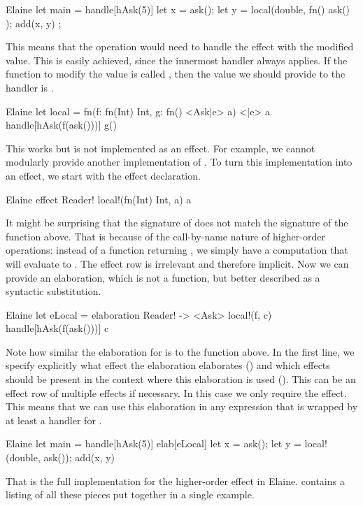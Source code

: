 \begin{lst}{Elaine}
let main = handle[hAsk(5)] {
    let x = ask();
    let y = local(double, fn() { ask() });
    add(x, y)
};
\end{lst}
%
This means that the  operation would need to handle the  effect with the modified value. This is easily achieved, since the innermost handler always applies. If the function to modify the value is called , then the value we should provide to the handler is .

\begin{lst}{Elaine}
let local = fn(f: fn(Int) Int, g: fn() <Ask|e> a) <|e> a {
    handle[hAsk(f(ask()))] { g() }
}
\end{lst}
%
This works but is not implemented as an effect. For example, we cannot modularly provide another implementation of . To turn this implementation into an effect, we start with the effect declaration.

\begin{lst}{Elaine}
effect Reader! {
    local!(fn(Int) Int, a) a
}
\end{lst}
%
It might be surprising that the signature of  does not match the signature of the function above. That is because of the call-by-name nature of higher-order operations: instead of a function returning , we simply have a computation that will evaluate to . The effect row is irrelevant and therefore implicit. Now we can provide an elaboration, which is not a function, but better described as a syntactic substitution.

\begin{lst}{Elaine}
let eLocal = elaboration Reader! -> <Ask> {
    local!(f, c) {
        handle[hAsk(f(ask()))] c
    }
}
\end{lst}
%
Note how similar the elaboration for  is to the  function above. In the first line, we specify explicitly what effect the elaboration elaborates () and which effects should be present in the context where this elaboration is used (). This can be an effect row of multiple effects if necessary. In this case we only require the  effect. This means that we can use this elaboration in any expression that is wrapped by at least a handler for .

\begin{lst}{Elaine}
let main = handle[hAsk(5)] elab[eLocal] {
    let x = ask();
    let y = local!(double, ask());
    add(x, y)
}
\end{lst}
%
That is the full implementation for the higher-order  effect in Elaine.  contains a listing of all these pieces put together in a single example.

